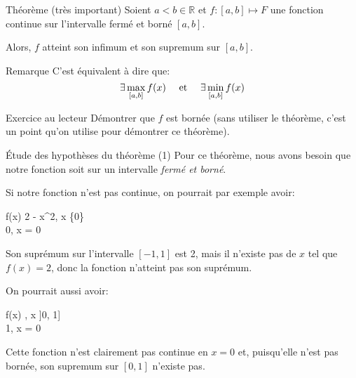 \documentclass[a4paper]{article}
\begin{document}
\begin{parag}{Théorème (très important)}
    Soient $a < b \in \mathbb{R}$ et $f : \left[a, b\right] \mapsto F$ une fonction continue sur l'intervalle fermé et borné $\left[a, b\right]$. 

    Alors, $f$ atteint son infimum et son supremum sur $\left[a, b\right]$.

    \begin{subparag}{Remarque}
        C'est équivalent à dire que: 
        \[\exists \max_{\left[a,b\right] } f\left(x\right) \mathspace \text{ et } \mathspace \exists \min_{\left[a,b\right]}f\left(x\right)\]
        
    \end{subparag}

    \begin{subparag}{Exercice au lecteur}
        Démontrer que $f$ est bornée (sans utiliser le théorème, c'est un point qu'on utilise pour démontrer ce théorème).
    \end{subparag}
    
    \begin{subparag}{Étude des hypothèses du théorème (1)}
        Pour ce théorème, nous avons besoin que notre fonction soit  sur un intervalle \textit{fermé et borné}.

        Si notre fonction n'est pas continue, on pourrait par exemple avoir: 
        \begin{functionbypart}{f\left(x\right)}
        2 - x^2, \mathspace x \in \left[-1, 1\right] \setminus \left\{0\right\} \\
        0, \mathspace x = 0
        \end{functionbypart}

        Son suprémum sur l'intervalle $\left[-1, 1\right]$ est 2, mais il n'existe pas de $x$ tel que $f\left(x\right) = 2$, donc la fonction n'atteint pas son suprémum.

        On pourrait aussi avoir:
        \begin{functionbypart}{f\left(x\right)}
            , \mathspace x \in \left]0, 1\right]  \\
            1, \mathspace x = 0
        \end{functionbypart}

        Cette fonction n'est clairement pas continue en $x = 0$ et, puisqu'elle n'est pas bornée, son supremum sur $\left[0, 1\right] $ n'existe pas.
    \end{subparag}


\end{parag}
\end{document}
